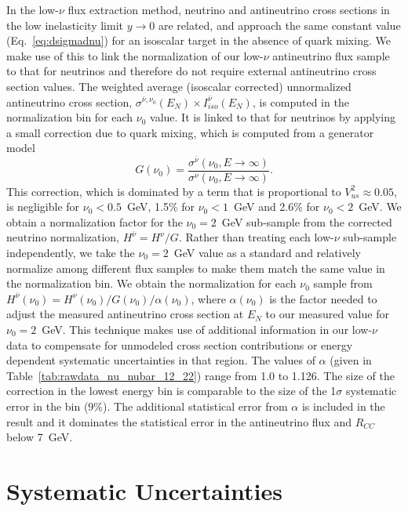 \documentclass[aps,preprint,showpacs,superscriptaddress,linenumbers,nofootinbib,prd,12pt]{revtex4}
\newcommand{\ratio}{\ensuremath{R_{CC}}}
\newcommand{\nunot}{\ensuremath{\nu_0}}
\newcommand{\realhnu}{\ensuremath{H^{\nu}(\nu_0)}}
\newcommand{\realhnubar}{\ensuremath{H^{\bar{\nu}}(\nu_0)}}
\begin{document}
In the low-$\nu$ flux extraction method, 
neutrino and antineutrino cross sections in the low inelasticity limit $y\to 0$ 
are related, and approach the same constant
value (Eq.~\eqref{eq:dsigmadnu}) for an isoscalar target in the absence of quark mixing. We make use of this 
to link the normalization of our low-$\nu$ antineutrino flux sample to that for neutrinos and therefore 
do not require external antineutrino cross section values.
The weighted average (isoscalar corrected) unnormalized antineutrino cross section, $\sigma^{\bar{\nu},\nu_0}(E_N)\times I^{\bar{\nu}}_{iso}( E_N)$, 
is computed in the normalization bin for each $\nunot$ value.
It is linked to that for neutrinos by applying a small correction due to quark mixing, which is
computed from a generator model
\begin{equation}
G(\nu_0)  =  \frac{\sigma^{\bar{\nu}}(\nu_0, E\to\infty)}{\sigma^{\nu}(\nu_0, E\to\infty)}.
\label{eq:gcorr}
\end{equation}
This correction, which is dominated by a term that is proportional to $V^2_{us}\approx 0.05$, 
is negligible for $\nu_0<0.5$~GeV, 1.5\% for $\nu_0<1$~GeV and 2.6\% for  $\nu_0<2$~GeV.
We obtain a normalization factor for the $\nu_0=2$~GeV
sub-sample from the corrected neutrino normalization, $H^{\bar{\nu}}=H^{\nu}/G$.
Rather than treating each low-$\nu$ sub-sample independently, we take 
the $\nu_0=2$~GeV value as a standard and relatively normalize among different flux samples to make them match the same value
in the normalization bin. We obtain the normalization for each $\nu_0$ sample 
from $\realhnubar{}=\realhnu{}/G(\nu_{0})/\alpha(\nu_{0})$, 
where $\alpha(\nu_0)$ is the factor needed to adjust the measured antineutrino cross section at $E_N$ to our measured value for $\nu_0=2$~GeV.
This technique makes use of additional information in our low-$\nu$ data to compensate for unmodeled cross section contributions or energy dependent systematic uncertainties in that region. 
The values of $\alpha$ (given in Table~\ref{tab:rawdata_nu_nubar_12_22}) range from 1.0 to 1.126. The size of the correction in the lowest energy bin is comparable to the size of the 1$\sigma$ systematic error in the bin (9\%). The additional statistical error from $\alpha$ is included in the result and it dominates the statistical error in the antineutrino flux and \ratio{} below 7~GeV. 

\section{Systematic Uncertainties}
\end{document}
